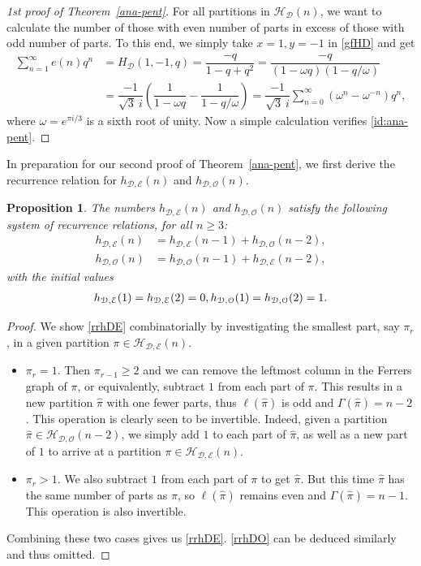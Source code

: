 \documentclass[12pt]{amsart}
\numberwithin{equation}{section}
\theoremstyle{plain}
\newtheorem{proposition}[theorem]{Proposition}
\theoremstyle{definition}
\def\D{\mathcal{D}}
\def\O{\mathcal{O}}
\def\H{\mathcal{H}}
\def\E{\mathcal{E}}
\begin{document}
\begin{proof}[1st proof of Theorem~\ref{ana-pent}]
For all partitions in $\H_{\D}(n)$, we want to calculate the number of those with even number of parts in excess of those with odd number of parts. To this end, we simply take $x=1,y=-1$ in \eqref{gfHD} and get
\begin{align*}
\sum\limits_{n=1}^{\infty} e(n)q^n &=H_{\D}(1,-1,q) = \dfrac{-q}{1-q+q^2}= \dfrac{-q}{(1-\omega q)(1-q/\omega)}\\
&=\dfrac{-1}{\sqrt{3}\:i}(\dfrac{1}{1-\omega q}-\dfrac{1}{1-q/\omega})= \dfrac{-1}{\sqrt{3}\:i}\sum\limits_{n=0}^{\infty}(\omega^n-\omega^{-n})q^n,
\end{align*}
where $\omega=e^{\pi i/3}$ is a sixth root of unity. Now a simple calculation verifies \eqref{id:ana-pent}.
\end{proof}

In preparation for our second proof of Theorem~\ref{ana-pent}, we first derive the recurrence relation for $h_{\D,\E}(n)$ and $h_{\D,\O}(n)$.
\begin{proposition}\label{rr-hDEO}
The numbers $h_{\mathcal{D, E}}(n)$ and $h_{\mathcal{D, O}}(n)$ satisfy the following system of recurrence relations, for all $n\geq 3$:
\begin{align}
h_{\mathcal{D, E}}(n) &=h_{\mathcal{D, E}}(n-1)+h_{\mathcal{D, O}}(n-2),\label{rrhDE}\\
h_{\mathcal{D, O}}(n) &=h_{\mathcal{D, O}}(n-1)+h_{\mathcal{D, E}}(n-2),\label{rrhDO}
\end{align}
with the initial values
\begin{gather}\label{iv}
h_{\D,\E}(1)=h_{\mathcal{D, E}}(2) = 0, h_{\mathcal{D, O}}(1)=h_{\mathcal{D, O}}(2)=1.\notag
\end{gather}
\end{proposition}
\begin{proof}
We show \eqref{rrhDE} combinatorially by investigating the smallest part, say $\pi_r$, in a given partition $\pi\in\H_{\D,\E}(n)$.
\begin{itemize}
\item $\pi_r=1$. Then $\pi_{r-1}\geq 2$ and we can remove the leftmost column in the Ferrers graph of $\pi$, or equivalently, subtract $1$ from each part of $\pi$. This results in a new partition $\hat{\pi}$ with one fewer parts, thus $\ell(\hat{\pi})$ is odd and $\Gamma(\hat{\pi})=n-2$. This operation is clearly seen to be invertible. Indeed, given a partition $\hat{\pi}\in\H_{\D,\O}(n-2)$, we simply add $1$ to each part of $\hat{\pi}$, as well as a new part of $1$ to arrive at a partition $\pi\in\H_{\D,\E}(n)$.
\item $\pi_r>1$. We also subtract $1$ from each part of $\pi$ to get $\hat{\pi}$. But this time $\hat{\pi}$ has the same number of parts as $\pi$, so $\ell(\hat{\pi})$ remains even and $\Gamma(\hat{\pi})=n-1$. This operation is also invertible.
\end{itemize}
Combining these two cases gives us \eqref{rrhDE}. \eqref{rrhDO} can be deduced similarly and thus omitted.
\end{proof}
\end{document}
